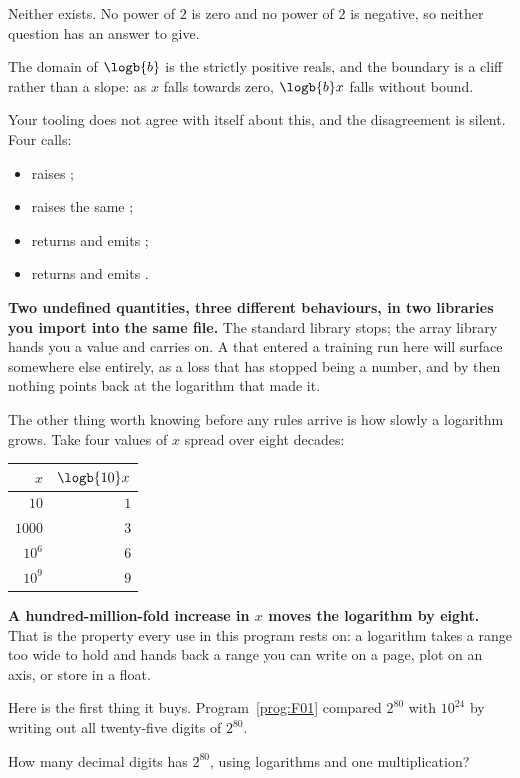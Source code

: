 \begin{fr}
\begin{ansblock}
Neither exists. No power of $2$ is zero and no power of $2$ is negative, so
neither question has an answer to give.

The domain of $\logb{b}$ is the strictly positive reals, and the boundary is a
cliff rather than a slope: as $x$ falls towards zero, $\logb{b} x$ falls
without bound.
\end{ansblock}

\begin{warning}
Your tooling does not agree with itself about this, and the disagreement is
silent. Four calls:

\begin{itemize}
\item {} raises ;
\item {} raises the same ;
\item {} returns  and emits
  ;
\item {} returns  and emits
  .
\end{itemize}

\textbf{Two undefined quantities, three different behaviours, in two libraries
you import into the same file.} The standard library stops; the array library
hands you a value and carries on. A  that entered a training run
here will surface somewhere else entirely, as a loss that has stopped being a
number, and by then nothing points back at the logarithm that made it.
\end{warning}
\end{fr}

\begin{fr}
The other thing worth knowing before any rules arrive is how slowly a logarithm
grows. Take four values of $x$ spread over eight decades:

\begin{center}
\begin{tabular}{rr}
\toprule
$x$ & $\logb{10} x$ \\
\midrule
$10$ & $1$ \\
$1000$ & $3$ \\
$10^{6}$ & $6$ \\
$10^{9}$ & $9$ \\
\bottomrule
\end{tabular}
\end{center}

\textbf{A hundred-million-fold increase in $x$ moves the logarithm by eight.}
That is the property every use in this program rests on: a logarithm takes a
range too wide to hold and hands back a range you can write on a page, plot on
an axis, or store in a float.

Here is the first thing it buys. Program~\ref{prog:F01} compared $2^{80}$ with
$10^{24}$ by writing out all twenty-five digits of $2^{80}$.

How many decimal digits has $2^{80}$, using logarithms and one multiplication?
\nextframe
\end{fr}

